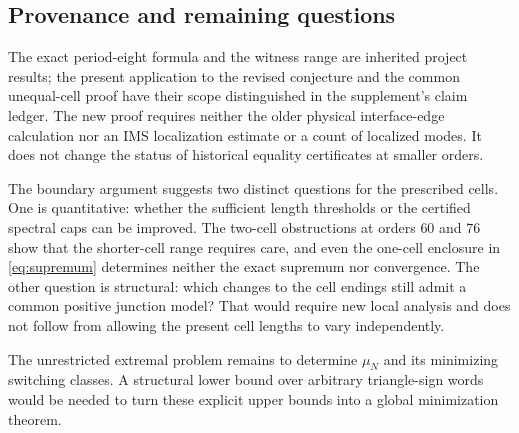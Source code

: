 \subsection{Provenance and remaining questions}

The exact period-eight formula and the witness range are inherited
project results; the present application to the revised conjecture and the
common unequal-cell proof have their scope distinguished in the supplement's
claim ledger. The new proof requires neither the older physical
interface-edge calculation nor an IMS localization estimate or a count of
localized modes. It does not change the status of historical equality
certificates at smaller orders.

The boundary argument suggests two distinct questions for the prescribed
cells. One is quantitative: whether the sufficient length thresholds or
the certified spectral caps can be improved. The two-cell obstructions at
orders $60$ and $76$ show that the shorter-cell range requires care, and
even the one-cell enclosure in \eqref{eq:supremum} determines neither the
exact supremum nor convergence. The other question is structural: which
changes to the cell endings still admit a common positive junction model?
That would require new local analysis and does not follow from allowing
the present cell lengths to vary independently.

The unrestricted extremal problem remains to determine $\mu_N$ and its
minimizing switching classes. A structural lower bound over arbitrary
triangle-sign words would be needed to turn these explicit upper bounds
into a global minimization theorem.
